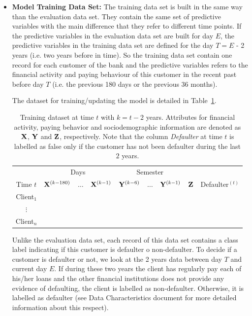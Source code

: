 \begin{itemize}
\item \textbf{Model Training Data Set:}  The training data set is built in the same way than the evaluation data set. They contain the same set of predictive variables with the main difference that they refer to different time points. If the predictive variables in the evaluation data set are built for day $E$, the predictive variables in the training data set are defined for the day $T = E$ - 2 years (i.e. two years before in time). So the training data set contain one record for each customer of the bank and the predictive variables refers to the financial activity and paying behaviour of this customer in the recent past before day $T$ (i.e. the previous 180 days or the previous 36 months). 

The dataset for training/updating the model is detailed in Table~\ref{tab:EvaluationDataset}.

\begin{table}[h]
\begin{tabular}{c|ccc|ccc|c|c}
	&\multicolumn{3}{c|}{Days} & \multicolumn{3}{c|}{Semester} & \\
     Time $t$              & $\mathbf{X}^{(k-180)}$ & $\ldots$ & $\mathbf{X}^{(k-1)} $ & $\mathbf{Y}^{(k-6)}$  & $\ldots$ & $\mathbf{Y}^{(k-1)} $ & $\mathbf{Z}$ & Defaulter$^{(t)}$\\  
\hline
Client$_1$  &                                                  &              &                     &                               &                     &        &  \\ 
$\vdots$      &                                                 &               &                     &                                &                     &       & \\ 
Client$_n$  &                                                &               &                     &                                &                     &     & \\ 
\end{tabular} 
\caption{Training dataset at time $t$ with $k=t - 2$ years.  Attributes for financial activity, paying behavior and sociodemographic information are denoted as $\mathbf{X}$, $\mathbf{Y}$ and $\mathbf{Z}$, respectively. Note that the column \emph{Defaulter} at time $t$ is labelled as false only if the customer has not been defaulter during the last $2$ years.}
\label{tab:EvaluationDataset} 
\end{table}


Unlike the evaluation data set, each record of this data set contains a class label indicating if this customer is defaulter o non-defaulter. To decide if a customer is defaulter or not, we look at the 2 years data between day $T$ and current day $E$. If during these two years the client has regularly pay each of his/her loans and the other financial institutions does not provide any evidence of defaulting, the client is labelled as non-defaulter. Otherwise, it is labelled as defaulter (see Data Characteristics document for more detailed information about this respect).   


\end{itemize}
